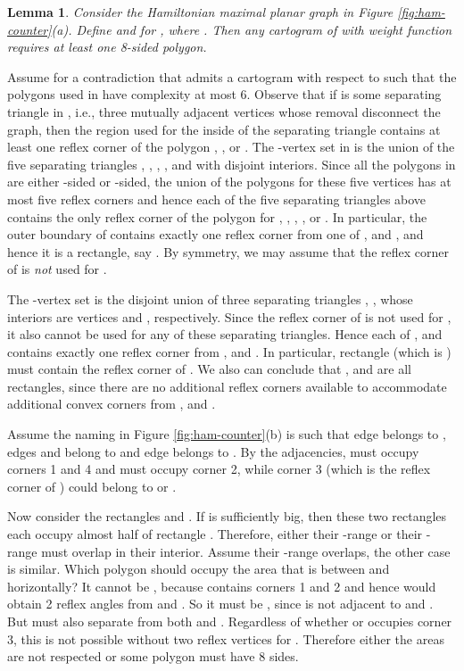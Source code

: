 \documentclass[11pt]{article}
\newtheorem{lemma}{Lemma}[section]
\newenvironment{proof}{{\bf Proof:} }{\hspace*{\fill}\vspace{2mm}}
\begin{document}
\begin{lemma}
\label{lem:ham-counter} Consider the Hamiltonian maximal planar graph  in Figure \ref{fig:ham-counter}(a).
 Define  and  for , where . Then any cartogram
 of  with weight function  requires at least one 8-sided polygon.
\end{lemma}
\begin{proof}
Assume for a contradiction that  admits a cartogram  with respect to  such that the polygons 
used in  have complexity at most 6.
Observe that if  is some
 separating triangle in , i.e.,
three mutually adjacent vertices whose removal disconnect the graph,
then the region  used for the inside of the separating triangle contains
at least one reflex corner of the polygon , , or .
 The -vertex set  in  is the union of the five separating triangles
 , , , , and  with disjoint interiors. Since all the
 polygons in  are either -sided or -sided,
 the union of
 the polygons for these five vertices has
 at most five reflex corners and hence each of the five separating triangles above contains the only reflex
 corner of the polygon for , , , , or .
In particular, the outer boundary of 
 contains exactly one reflex corner from one of ,  and , and hence it is a rectangle, say
 .
By symmetry, we may assume that the reflex corner of  is {\em not}
used for .

The -vertex set  is the disjoint union of
three separating triangles , , 
whose interiors are vertices  and , respectively.
Since the reflex corner of  is not used for , it
also cannot be used for any of these separating triangles. Hence each
of ,  and  contains exactly one reflex
corner from ,  and .  In particular,
rectangle  (which is ) must contain the reflex corner
of .   We also can conclude that
,  and  are all rectangles, since there are no
additional reflex corners available to accommodate additional
convex corners from ,  and .

Assume the naming in Figure \ref{fig:ham-counter}(b) is such
that edge  belongs to , edges  and  belong to 
and edge  belongs to .   By the adjacencies,  must occupy
corners 1 and 4 and  must occupy corner 2, while corner 3 (which
is the reflex corner of ) could belong to  or .

Now consider the rectangles  and .  If  is sufficiently big,
then these two rectangles each occupy almost half of rectangle .
Therefore, either their -range or their -range must overlap in their
interior.
Assume their -range overlaps, the other case is similar.  Which polygon
should occupy the area that is between  and  horizontally?
It cannot be , because  contains corners 1 and 2 and hence would
obtain 2 reflex angles from  and .  So it must be , since
 is not adjacent to  and .
But  must
also separate  from both  and .  Regardless of whether
 or  occupies corner 3, this is not possible without two reflex
vertices for .
Therefore either the areas are not respected or some polygon must have
8 sides.
\end{proof}
\end{document}
